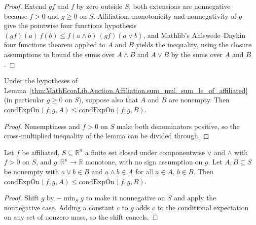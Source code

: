 \begin{proof}
\leanok
Extend $g f$ and $f$ by zero outside $S$; both extensions are nonnegative because $f > 0$ and $g \ge 0$ on $S$. Affiliation, monotonicity and nonnegativity of $g$ give the pointwise four functions hypothesis $(gf)(a)\, f(b) \le f(a \wedge b)\, (gf)(a \vee b)$, and Mathlib's Ahlswede--Daykin four functions theorem applied to $A$ and $B$ yields the inequality, using the closure assumptions to bound the sums over $A \wedge B$ and $A \vee B$ by the sums over $A$ and $B$.
\end{proof}

\begin{theorem}\label{thm:MathEconLib.Auction.Affiliation.condExpOn_le_condExpOn_of_affiliated_of_nonneg}
\leanok
{}
Under the hypotheses of Lemma~\ref{thm:MathEconLib.Auction.Affiliation.sum_mul_sum_le_of_affiliated} (in particular $g \ge 0$ on $S$), suppose also that $A$ and $B$ are nonempty. Then $\mathrm{condExpOn}(f, g, A) \le \mathrm{condExpOn}(f, g, B)$.
\end{theorem}

\begin{proof}
\leanok
{}
Nonemptiness and $f > 0$ on $S$ make both denominators positive, so the cross-multiplied inequality of the lemma can be divided through.
\end{proof}

\begin{theorem}\label{thm:MathEconLib.Auction.Affiliation.condExpOn_le_condExpOn_of_affiliated}
\leanok
{}
Let $f$ be affiliated, $S \subseteq \mathbb{R}^n$ a finite set closed under componentwise $\vee$ and $\wedge$ with $f > 0$ on $S$, and $g : \mathbb{R}^n \to \mathbb{R}$ monotone, with no sign assumption on $g$. Let $A, B \subseteq S$ be nonempty with $a \vee b \in B$ and $a \wedge b \in A$ for all $a \in A$, $b \in B$. Then $\mathrm{condExpOn}(f, g, A) \le \mathrm{condExpOn}(f, g, B)$.
\end{theorem}

\begin{proof}
\leanok
{}
Shift $g$ by $-\min_S g$ to make it nonnegative on $S$ and apply the nonnegative case. Adding a constant $c$ to $g$ adds $c$ to the conditional expectation on any set of nonzero mass, so the shift cancels.
\end{proof}

